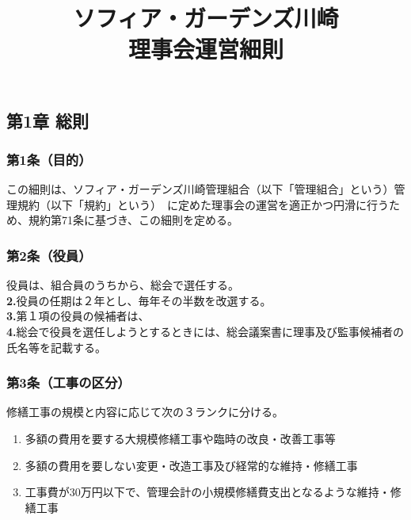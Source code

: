 \documentclass[12pt,uplatex]{jsarticle}
\title{ソフィア・ガーデンズ川崎 \\  理事会運営細則}
\begin{document}
\maketitle
\tableofcontents
\clearpage
\addtocounter{page}{-1}
\pagestyle{plain}

\begin{center}
\subsection*{第1章 総則}
\end{center}
\subsubsection*{ 第1条（目的）}
この細則は、ソフィア・ガーデンズ川崎管理組合（以下「管理組合」という）管理規約（以下「規約」という）\
に定めた理事会の運営を適正かつ円滑に行うため、規約第71条に基づき、この細則を定める。
\subsubsection*{ 第2条（役員）}
役員は、組合員のうちから、総会で選任する。\\
\textbf{2.}役員の任期は２年とし、毎年その半数を改選する。\\
\textbf{3.}第１項の役員の候補者は、\\
\textbf{4.}総会で役員を選任しようとするときには、総会議案書に理事及び監事候補者の氏名等を記載する。

\subsubsection*{ 第3条（工事の区分）}
修繕工事の規模と内容に応じて次の３ランクに分ける。
\begin{enumerate}
  \item 多額の費用を要する大規模修繕工事や臨時の改良・改善工事等
  \item 多額の費用を要しない変更・改造工事及び経常的な維持・修繕工事
  \item 工事費が30万円以下で、管理会計の小規模修繕費支出となるような維持・修繕工事
\end{enumerate}
\end{document}

